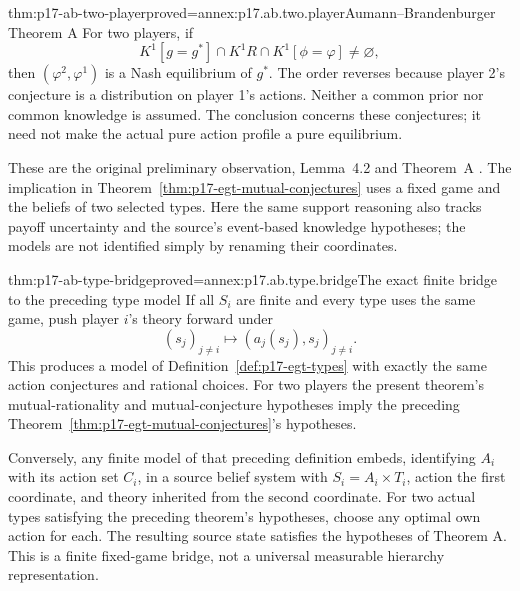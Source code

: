 \begin{hbtheorem}{thm:p17-ab-two-player}{proved=annex:p17.ab.two.player}{Aumann--Brandenburger Theorem A}
For two players, if
\[
       K^1[g=g^*]\cap K^1R\cap K^1[\phi=\varphi]\ne\varnothing ,
\]
then \((\varphi^2,\varphi^1)\) is a Nash equilibrium of \(g^*\).
The order reverses because player 2's conjecture is a distribution
on player 1's actions. Neither a common prior nor common knowledge
is assumed. The conclusion concerns these conjectures; it need
not make the actual pure action profile a pure equilibrium.
\end{hbtheorem}

These are the original preliminary observation, Lemma~4.2 and
Theorem~A \parencite[pp.~1167--1168]{AumannBrandenburger1995Epistemic}.
The implication in Theorem~\ref{thm:p17-egt-mutual-conjectures}
uses a fixed game and the beliefs of two selected types. Here the
same support reasoning also tracks payoff uncertainty and the
source's event-based knowledge hypotheses; the models are not
identified simply by renaming their coordinates.

\begin{hblemma}{thm:p17-ab-type-bridge}{proved=annex:p17.ab.type.bridge}{The exact finite bridge to the preceding type model}
If all \(S_i\) are finite and every type uses the same game,
push player \(i\)'s theory forward under
\[
        (s_j)_{j\ne i}\longmapsto(a_j(s_j),s_j)_{j\ne i}.
\]
This produces a model of Definition~\ref{def:p17-egt-types}
with exactly the same action conjectures and rational choices.
For two players the present theorem's mutual-rationality and
mutual-conjecture hypotheses imply the preceding
Theorem~\ref{thm:p17-egt-mutual-conjectures}'s hypotheses.

Conversely, any finite model of that preceding definition embeds,
identifying \(A_i\) with its action set \(C_i\), in a source belief
system with \(S_i=A_i\times T_i\), action the
first coordinate, and theory inherited from the second coordinate.
For two actual types satisfying the preceding theorem's hypotheses,
choose any optimal own action for each. The resulting source state
satisfies the hypotheses of Theorem A. This is a finite fixed-game
bridge, not a universal measurable hierarchy representation.
\end{hblemma}

